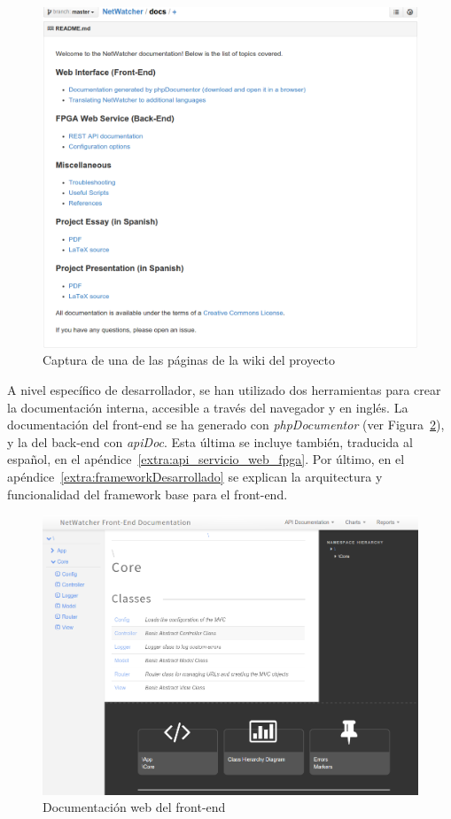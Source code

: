 \begin{figure}[!htp]
  \centering
  \includegraphics[width=\textwidth,clip=true]{graphics/capturas/github_docs}
  \caption{Captura de una de las páginas de la wiki del proyecto}
  \label{fig:captura:wiki}
\end{figure}

A nivel específico de desarrollador, se han utilizado dos herramientas para crear la documentación interna, accesible a través del navegador y en inglés.
La documentación del \gls{front-end} se ha generado con \textit{phpDocumentor} (ver Figura~\ref{fig:captura:docsfrontend}), y la del \gls{back-end} con \textit{apiDoc}.
Esta última se incluye también, traducida al español, en el apéndice~\ref{extra:api_servicio_web_fpga}.
Por último, en el apéndice~\ref{extra:frameworkDesarrollado} se explican la arquitectura y funcionalidad del \gls{framework} base para el \gls{front-end}.

\begin{figure}[!htp]
  \centering
  \includegraphics[width=\textwidth,clip=true]{graphics/capturas/docs_frontend}
  \caption{Documentación web del \gls{front-end}}
  \label{fig:captura:docsfrontend}
\end{figure}

